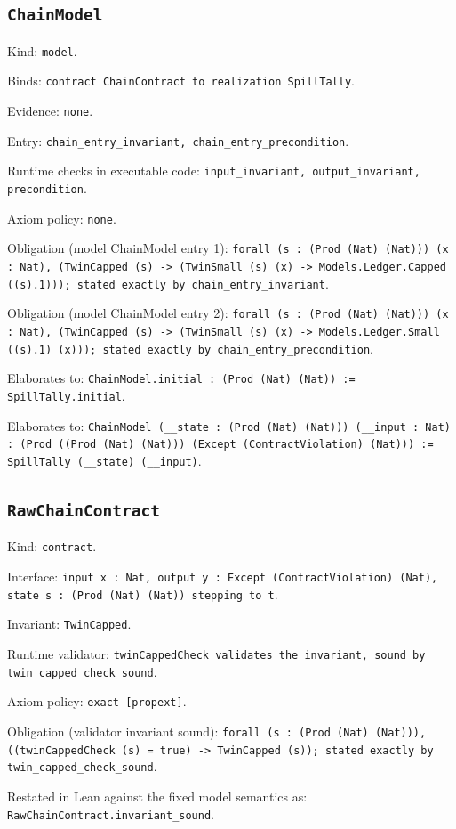 \documentclass[11pt]{article}
\begin{document}
\subsection*{\texttt{ChainModel}}
\noindent Kind: \texttt{model}.\par
\noindent Binds: \texttt{contract ChainContract to realization SpillTally}.\par
\noindent Evidence: \texttt{none}.\par
\noindent Entry: \texttt{chain\_entry\_invariant, chain\_entry\_precondition}.\par
\noindent Runtime checks in executable code: \texttt{input\_invariant, output\_invariant, precondition}.\par
\noindent Axiom policy: \texttt{none}.\par
\noindent Obligation (model ChainModel entry 1): \texttt{forall (s : (Prod (Nat) (Nat))) (x : Nat), (TwinCapped (s) -> (TwinSmall (s) (x) -> Models.Ledger.Capped ((s).1))); stated exactly by chain\_entry\_invariant}.\par
\noindent Obligation (model ChainModel entry 2): \texttt{forall (s : (Prod (Nat) (Nat))) (x : Nat), (TwinCapped (s) -> (TwinSmall (s) (x) -> Models.Ledger.Small ((s).1) (x))); stated exactly by chain\_entry\_precondition}.\par
\noindent Elaborates to: \texttt{ChainModel.initial : (Prod (Nat) (Nat)) := SpillTally.initial}.\par
\noindent Elaborates to: \texttt{ChainModel (\_\_state : (Prod (Nat) (Nat))) (\_\_input : Nat) : (Prod ((Prod (Nat) (Nat))) (Except (ContractViolation) (Nat))) := SpillTally (\_\_state) (\_\_input)}.\par
\subsection*{\texttt{RawChainContract}}
\noindent Kind: \texttt{contract}.\par
\noindent Interface: \texttt{input x : Nat, output y : Except (ContractViolation) (Nat), state s : (Prod (Nat) (Nat)) stepping to t}.\par
\noindent Invariant: \texttt{TwinCapped}.\par
\noindent Runtime validator: \texttt{twinCappedCheck validates the invariant, sound by twin\_capped\_check\_sound}.\par
\noindent Axiom policy: \texttt{exact [propext]}.\par
\noindent Obligation (validator invariant sound): \texttt{forall (s : (Prod (Nat) (Nat))), ((twinCappedCheck (s) = true) -> TwinCapped (s)); stated exactly by twin\_capped\_check\_sound}.\par
\noindent Restated in Lean against the fixed model semantics as: \texttt{RawChainContract.invariant\_sound}.\par
\end{document}
